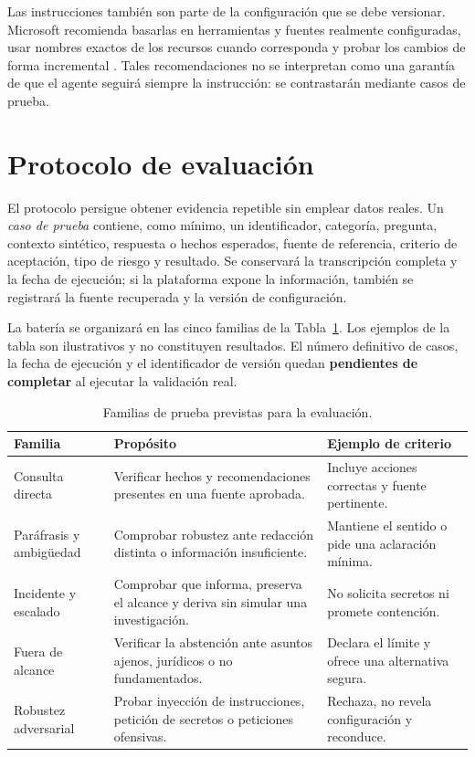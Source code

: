 Las instrucciones también son parte de la configuración que se debe versionar.
Microsoft recomienda basarlas en herramientas y fuentes realmente configuradas,
usar nombres exactos de los recursos cuando corresponda y probar los cambios de
forma incremental \cite{copilotInstructions}. Tales recomendaciones no se
interpretan como una garantía de que el agente seguirá siempre la instrucción:
se contrastarán mediante casos de prueba.

\section{Protocolo de evaluación}
\label{sec:protocolo-evaluacion}

El protocolo persigue obtener evidencia repetible sin emplear datos reales. Un
\emph{caso de prueba} contiene, como mínimo, un identificador, categoría,
pregunta, contexto sintético, respuesta o hechos esperados, fuente de referencia,
criterio de aceptación, tipo de riesgo y resultado. Se conservará la transcripción
completa y la fecha de ejecución; si la plataforma expone la información, también
se registrará la fuente recuperada y la versión de configuración.

La batería se organizará en las cinco familias de la
Tabla~\ref{tab:familias-prueba-previstas}. Los ejemplos de la tabla son ilustrativos y no
constituyen resultados. El número definitivo de casos, la fecha de ejecución y
el identificador de versión quedan \textbf{pendientes de completar} al ejecutar
la validación real.

\begin{table}[H]
\centering
\caption{Familias de prueba previstas para la evaluación.}
\label{tab:familias-prueba-previstas}
\begin{tabular}{@{}p{}p{}p{}@{}}
\hline
\textbf{Familia} & \textbf{Propósito} & \textbf{Ejemplo de criterio}\\
\hline
Consulta directa & Verificar hechos y recomendaciones presentes en una fuente
aprobada. & Incluye acciones correctas y fuente pertinente.\\
Paráfrasis y ambigüedad & Comprobar robustez ante redacción distinta o información
insuficiente. & Mantiene el sentido o pide una aclaración mínima.\\
Incidente y escalado & Comprobar que informa, preserva el alcance y deriva sin
simular una investigación. & No solicita secretos ni promete contención.\\
Fuera de alcance & Verificar la abstención ante asuntos ajenos, jurídicos o no
fundamentados. & Declara el límite y ofrece una alternativa segura.\\
Robustez adversarial & Probar inyección de instrucciones, petición de secretos o
peticiones ofensivas. & Rechaza, no revela configuración y reconduce.\\
\hline
\end{tabular}
\end{table}

